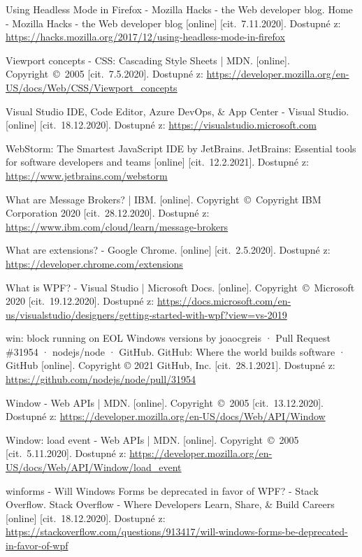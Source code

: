 \begin{thebibliography}{99}
 Using Headless Mode in Firefox - Mozilla Hacks - the Web developer blog. Home - Mozilla Hacks - the Web developer blog [online] [cit.~7.11.2020]. Dostupné z: \url{https://hacks.mozilla.org/2017/12/using-headless-mode-in-firefox}

 Viewport concepts - CSS: Cascading Style Sheets | MDN. [online]. Copyright~©~2005 [cit.~7.5.2020]. Dostupné z: \url{https://developer.mozilla.org/en-US/docs/Web/CSS/Viewport_concepts}

 Visual Studio IDE, Code Editor, Azure DevOps, \& App Center - Visual Studio. [online] [cit.~18.12.2020]. Dostupné z: \url{https://visualstudio.microsoft.com}

 WebStorm: The Smartest JavaScript IDE by JetBrains. JetBrains: Essential tools for software developers and teams [online] [cit.~12.2.2021]. Dostupné z: \url{https://www.jetbrains.com/webstorm}

 What are Message Brokers? | IBM. [online]. Copyright~©~Copyright IBM Corporation 2020 [cit.~28.12.2020]. Dostupné z: \url{https://www.ibm.com/cloud/learn/message-brokers}

 What are extensions? - Google Chrome. [online] [cit.~2.5.2020]. Dostupné z: \url{https://developer.chrome.com/extensions}

 What is WPF? - Visual Studio | Microsoft Docs. [online]. Copyright~©~Microsoft 2020 [cit.~19.12.2020]. Dostupné z: \url{https://docs.microsoft.com/en-us/visualstudio/designers/getting-started-with-wpf?view=vs-2019}

win: block running on EOL Windows versions by joaocgreis · Pull Request \#31954 · nodejs/node · GitHub. GitHub: Where the world builds software · GitHub [online]. Copyright © 2021 GitHub, Inc. [cit.~28.1.2021]. Dostupné z: \url{https://github.com/nodejs/node/pull/31954}

 Window - Web APIs | MDN. [online]. Copyright~©~2005 [cit.~13.12.2020]. Dostupné z: \url{https://developer.mozilla.org/en-US/docs/Web/API/Window}

 Window: load event - Web APIs | MDN. [online]. Copyright~©~2005 [cit.~5.11.2020]. Dostupné z: \url{https://developer.mozilla.org/en-US/docs/Web/API/Window/load_event}

 winforms - Will Windows Forms be deprecated in favor of WPF? - Stack Overflow. Stack Overflow - Where Developers Learn, Share, \& Build Careers [online] [cit.~18.12.2020]. Dostupné z: \url{https://stackoverflow.com/questions/913417/will-windows-forms-be-deprecated-in-favor-of-wpf}


\end{thebibliography}
